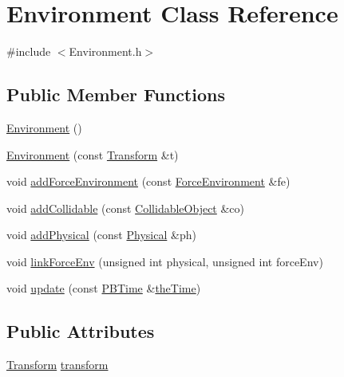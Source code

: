 \hypertarget{class_environment}{\section{Environment Class Reference}
\label{class_environment}
}


{\ttfamily \#include $<$Environment.\-h$>$}

\subsection*{Public Member Functions}
\begin{DoxyCompactItemize}
\item 
\hyperlink{class_environment_a8b427c4448d8b7536666837521b9e83d}{Environment} ()
\item 
\hyperlink{class_environment_a23d58e47f81b141b2802e3f0b730c154}{Environment} (const \hyperlink{class_transform}{Transform} \&t)
\item 
void \hyperlink{class_environment_ad32cd563f0849fcbb097c5b05c6646ed}{add\-Force\-Environment} (const \hyperlink{class_force_environment}{Force\-Environment} \&fe)
\item 
void \hyperlink{class_environment_ac09236d36211cdbf2836aca73847cd8c}{add\-Collidable} (const \hyperlink{class_collidable_object}{Collidable\-Object} \&co)
\item 
void \hyperlink{class_environment_a33f09db8b861a0eb48ea0310560180d8}{add\-Physical} (const \hyperlink{class_physical}{Physical} \&ph)
\item 
void \hyperlink{class_environment_a58ed629cb5f416d9b311dbb3f8f776c4}{link\-Force\-Env} (unsigned int physical, unsigned int force\-Env)
\item 
void \hyperlink{class_environment_ad969e09a5ccb33b3948f35b80649f279}{update} (const \hyperlink{class_p_b_time}{P\-B\-Time} \&\hyperlink{_physically_based_8h_a766da334af281a8fa1ed5cf404d0ec45}{the\-Time})
\end{DoxyCompactItemize}
\subsection*{Public Attributes}
\begin{DoxyCompactItemize}
\item 
\hyperlink{class_transform}{Transform} \hyperlink{class_environment_a334e187e5b58de5e60161627e9196ee3}{transform}
\end{DoxyCompactItemize}



